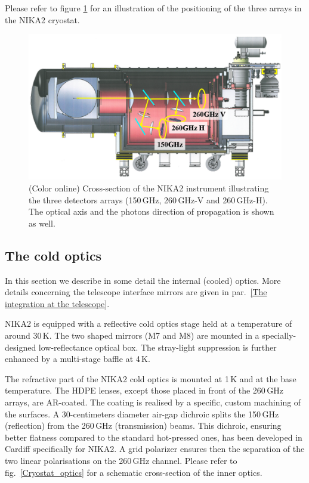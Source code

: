 \documentclass[]{aa} %
\begin{document}
Please refer to figure \ref{Cryostat} for an illustration of the positioning of the three arrays in the NIKA2 cryostat.
 
\begin{figure}[h]
   \centering
   \includegraphics[width=.95\linewidth]{Fig1_cryo.png}
      \caption{(Color online) Cross-section of the NIKA2 instrument illustrating the three detectors arrays (150\,GHz, 260\,GHz-V and 260\,GHz-H). The optical axis and the photons direction of propagation is shown as well.}
         \label{Cryostat}
\end{figure}


 \subsection{The cold optics}

In this section we describe in some detail the internal (cooled) optics. More details concerning the telescope interface mirrors are given in par.~\ref{The integration at the telescope}.

NIKA2 is equipped with a reflective cold optics stage held at a temperature of around 30\,K. The two shaped mirrors (M7 and M8) are mounted in a specially-designed low-reflectance optical box. The stray-light suppression is further enhanced by a multi-stage baffle at 4\,K.

The refractive part of the NIKA2 cold optics is mounted at 1\,K and at the base temperature. The HDPE lenses, except those placed in front of the 260\,GHz arrays, are AR-coated. The coating is realised by a specific, custom machining of the surfaces. A 30-centimeters diameter air-gap dichroic splits the 150\,GHz (reflection) from the 260\,GHz (transmission) beams. This dichroic, ensuring better flatness compared to the standard hot-pressed ones, has been developed in Cardiff specifically for NIKA2. A grid polarizer ensures then the separation of the two linear polarisations on the 260\,GHz channel. Please refer to fig.~\ref{Cryostat_optics} for a schematic cross-section of the inner optics.
\end{document}
